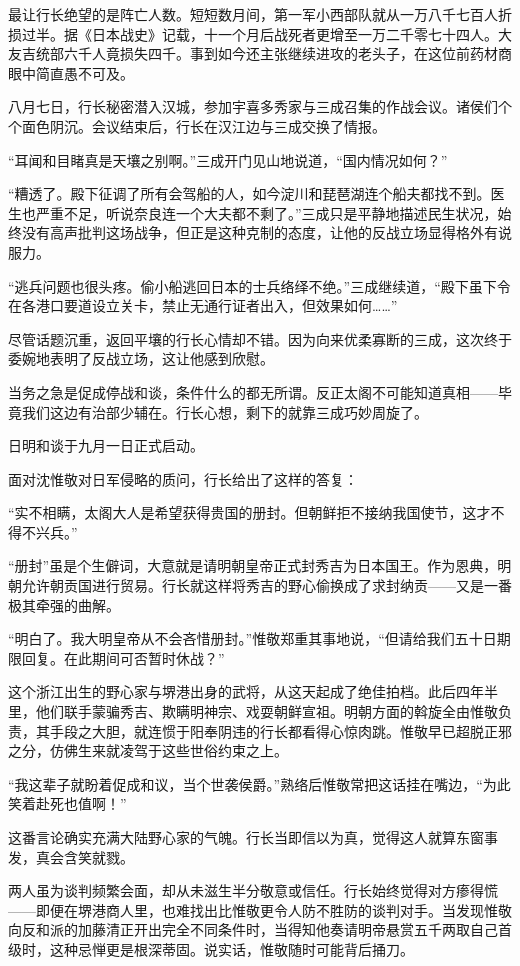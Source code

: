 \documentclass[
]{book}
\begin{document}
最让行长绝望的是阵亡人数。短短数月间，第一军小西部队就从一万八千七百人折损过半。据《日本战史》记载，十一个月后战死者更增至一万二千零七十四人。大友吉统部六千人竟损失四千。事到如今还主张继续进攻的老头子，在这位前药材商眼中简直愚不可及。

八月七日，行长秘密潜入汉城，参加宇喜多秀家与三成召集的作战会议。诸侯们个个面色阴沉。会议结束后，行长在汉江边与三成交换了情报。

``耳闻和目睹真是天壤之别啊。''三成开门见山地说道，``国内情况如何？''

``糟透了。殿下征调了所有会驾船的人，如今淀川和琵琶湖连个船夫都找不到。医生也严重不足，听说奈良连一个大夫都不剩了。''三成只是平静地描述民生状况，始终没有高声批判这场战争，但正是这种克制的态度，让他的反战立场显得格外有说服力。

``逃兵问题也很头疼。偷小船逃回日本的士兵络绎不绝。''三成继续道，``殿下虽下令在各港口要道设立关卡，禁止无通行证者出入，但效果如何\ldots\ldots{}''

尽管话题沉重，返回平壤的行长心情却不错。因为向来优柔寡断的三成，这次终于委婉地表明了反战立场，这让他感到欣慰。

当务之急是促成停战和谈，条件什么的都无所谓。反正太阁不可能知道真相------毕竟我们这边有治部少辅在。行长心想，剩下的就靠三成巧妙周旋了。

日明和谈于九月一日正式启动。

面对沈惟敬对日军侵略的质问，行长给出了这样的答复：

``实不相瞒，太阁大人是希望获得贵国的册封。但朝鲜拒不接纳我国使节，这才不得不兴兵。''

``册封''虽是个生僻词，大意就是请明朝皇帝正式封秀吉为日本国王。作为恩典，明朝允许朝贡国进行贸易。行长就这样将秀吉的野心偷换成了求封纳贡------又是一番极其牵强的曲解。

``明白了。我大明皇帝从不会吝惜册封。''惟敬郑重其事地说，``但请给我们五十日期限回复。在此期间可否暂时休战？''

这个浙江出生的野心家与堺港出身的武将，从这天起成了绝佳拍档。此后四年半里，他们联手蒙骗秀吉、欺瞒明神宗、戏耍朝鲜宣祖。明朝方面的斡旋全由惟敬负责，其手段之大胆，就连惯于阳奉阴违的行长都看得心惊肉跳。惟敬早已超脱正邪之分，仿佛生来就凌驾于这些世俗约束之上。

``我这辈子就盼着促成和议，当个世袭侯爵。''熟络后惟敬常把这话挂在嘴边，``为此笑着赴死也值啊！''

这番言论确实充满大陆野心家的气魄。行长当即信以为真，觉得这人就算东窗事发，真会含笑就戮。

两人虽为谈判频繁会面，却从未滋生半分敬意或信任。行长始终觉得对方瘆得慌------即便在堺港商人里，也难找出比惟敬更令人防不胜防的谈判对手。当发现惟敬向反和派的加藤清正开出完全不同条件时，当得知他奏请明帝悬赏五千两取自己首级时，这种忌惮更是根深蒂固。说实话，惟敬随时可能背后捅刀。
\end{document}
